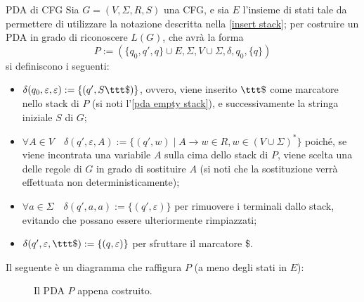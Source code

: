 \documentclass[a4paper, 12pt]{report}
\begin{document}
    \begin{framedmeth}[label={cfg into pda}]{PDA di CFG}
        Sia $G = (V, \Sigma, R, S)$ una CFG, e sia $E$ l'insieme di stati tale da permettere di utilizzare la notazione descritta nella \cref{insert stack}; per costruire un PDA in grado di riconoscere $L(G)$, che avrà la forma $$P := (\{q_0, q', q\} \cup E, \Sigma, V \cup \Sigma, \delta, q_0, \{q\})$$ si definiscono i seguenti:

        \begin{itemize}
            \item $\delta(q_0, \varepsilon, \varepsilon) := \{(q', S \ttt \$) \}$, ovvero, viene inserito $\ttt \$$ come marcatore nello stack di $P$ (si noti l'\cref{pda empty stack}), e successivamente la stringa iniziale $S$ di $G$;
            \item $\forall A \in V \quad \delta(q', \varepsilon, A) := \{ (q', w) \mid A \to w \in R, w \in (V \cup \Sigma)^*\}$ poiché, se viene incontrata una variabile $A$ sulla cima dello stack di $P$, viene scelta una delle regole di $G$ in grado di sostituire $A$ (si noti che la sostituzione verrà effettuata non deterministicamente);
            \item $\forall a \in \Sigma \quad \delta(q', a, a) := \{ (q', \varepsilon) \}$ per rimuovere i terminali dallo stack, evitando che possano essere ulteriormente rimpiazzati;
            \item $\delta(q', \varepsilon, \ttt \$) := \{(q, \varepsilon) \}$ per sfruttare il marcatore \ttt \$.
        \end{itemize}

        Il seguente è un diagramma che raffigura $P$ (a meno degli stati in $E$):

        \begin{figure}[H]
            \centering
             \caption{Il PDA $P$ appena costruito.}
        \end{figure}
    \end{framedmeth}
\end{document}
